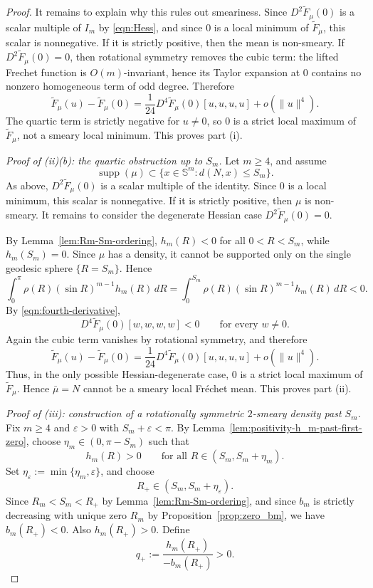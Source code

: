 \documentclass{amsart}
\theoremstyle{definition}
\theoremstyle{remark}
\newcommand{\mubar}{\bar{\mu}}
\newcommand\0{\boldsymbol{0}}
\begin{document}
\begin{proof}
It remains to explain why this rules out smeariness. Since \(D^2\widetilde F_\mu(0)\) is a scalar multiple of \(I_m\) by \eqref{eqn:Hess}, and since \(0\) is a local minimum of \(\widetilde F_\mu\), this scalar is nonnegative. If it is strictly positive, then the mean is non-smeary. If \(D^2\widetilde F_\mu(0)=0\), then rotational symmetry removes the cubic term: the lifted Frechet function is \(O(m)\)-invariant, hence its Taylor expansion at \(0\) contains no nonzero homogeneous term of odd degree. Therefore
\[
\widetilde F_\mu(u)-\widetilde F_\mu(0)
=
\frac{1}{24}D^4\widetilde F_\mu(0)[u,u,u,u]+o(\|u\|^4).
\]
The quartic term is strictly negative for \(u\neq0\), so \(0\) is a strict local maximum of \(\widetilde F_\mu\), not a smeary local minimum. This proves part (i).

\emph{Proof of (ii)(b): the quartic obstruction up to \(S_m\).}
Let \(m\ge4\), and assume
\[
\operatorname{supp}(\mu)\subset \{x\in\mathbb S^m:d(N,x)\le S_m\}.
\]
As above, \(D^2\widetilde F_\mu(0)\) is a scalar multiple of the identity. Since \(0\) is a local minimum, this scalar is nonnegative. If it is strictly positive, then \(\mu\) is non-smeary. It remains to consider the degenerate Hessian case \(D^2\widetilde F_\mu(0)=0\).

By Lemma~\ref{lem:Rm-Sm-ordering}, \(h_m(R)<0\) for all \(0<R<S_m\), while \(h_m(S_m)=0\). Since \(\mu\) has a density, it cannot be supported only on the single geodesic sphere \(\{R=S_m\}\). Hence
\[
\int_0^\pi \rho(R)(\sin R)^{m-1}h_m(R)\,dR
=
\int_0^{S_m}\rho(R)(\sin R)^{m-1}h_m(R)\,dR<0.
\]
By \eqref{eqn:fourth-derivative},
\[
D^4\widetilde F_\mu(0)[w,w,w,w]<0
\qquad\text{for every }w\neq0.
\]
Again the cubic term vanishes by rotational symmetry, and therefore
\[
\widetilde F_\mu(u)-\widetilde F_\mu(0)
=
\frac{1}{24}D^4\widetilde F_\mu(0)[u,u,u,u]+o(\|u\|^4).
\]
Thus, in the only possible Hessian-degenerate case, \(0\) is a strict local maximum of \(\widetilde F_\mu\). Hence \(\mubar=N\) cannot be a smeary local Fréchet mean. This proves part (ii).

\emph{Proof of (iii): construction of a rotationally symmetric \(2\)-smeary density past \(S_m\).}
Fix \(m\ge4\) and \(\varepsilon>0\) with \(S_m+\varepsilon<\pi\). By Lemma~\ref{lem:positivity-h_m-past-first-zero}, choose \(\eta_m\in(0,\pi-S_m)\) such that
\[
h_m(R)>0
\qquad\text{for all }R\in(S_m,S_m+\eta_m).
\]
Set \(\eta_\varepsilon:=\min\{\eta_m,\varepsilon\}\), and choose
\[
R_+\in(S_m,S_m+\eta_\varepsilon).
\]
Since \(R_m<S_m<R_+\) by Lemma~\ref{lem:Rm-Sm-ordering}, and since \(b_m\) is strictly decreasing with unique zero \(R_m\) by Proposition~\ref{prop:zero_bm}, we have \(b_m(R_+)<0\). Also \(h_m(R_+)>0\). Define
\[
q_+:=\frac{h_m(R_+)}{-b_m(R_+)}>0.
\]


\end{proof}
\end{document}
